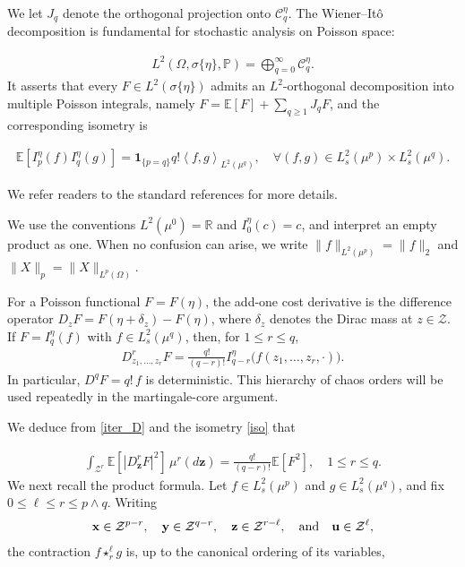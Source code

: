 \documentclass[letterpaper,11pt,reqno]{amsart}
\numberwithin{equation}{section}
\theoremstyle{plain}
\theoremstyle{definition}
\theoremstyle{remark}
\newcommand{\E}{\mathbb{E}}
\newcommand{\PP}{\mathbb{P}}
\newcommand{\R}{\mathbb{R}}
\newcommand{\ind}{\mathbf{1}}
\newcommand{\cC}{\mathcal{C}}
\newcommand{\cZ}{\mathcal{Z}}
\newcommand{\noi}{\noindent}
\newcommand{\dd}{d}
\newcommand{\s}{\sigma}
\newcommand{\inner}[2]{\left\langle #1,#2\right\rangle}
\newcommand{\AND}{\quad{\rm and}\quad}
\begin{document}
We let $J_q$ denote the orthogonal projection onto $\cC_q^\eta$.
The Wiener--It\^o decomposition is fundamental for stochastic
analysis on Poisson space:

\noi
\begin{align*}
 L^2(\Omega, \s\{\eta\}, \PP)
 =\bigoplus_{q=0}^{\infty}\cC_q^\eta.
\end{align*}
It asserts that every $F\in L^2(\sigma\{\eta\})$ admits an
$L^2$-orthogonal decomposition into multiple Poisson integrals, namely
$F=\E[F]+\sum_{q\geq1}J_qF$,
and the corresponding isometry is

\noi
\begin{align}
 \E[I_p^\eta(f)I_q^\eta(g)]
 =\ind_{\{p=q\}}q!
 \inner{f}{g}_{L^2(\mu^q)},
 \quad
 \forall (f,g)\in L_s^2(\mu^p)\times L_s^2(\mu^q).
 \label{iso}
\end{align}

We refer readers to
the standard references \cite{PT11,Las16,LP18}
for more details.

We use the conventions $L^2(\mu^0)=\R$ and
$I_0^\eta(c)=c$, and interpret an empty product as one.
When no confusion can arise, we write
$\|f\|_{L^2(\mu^p)}=\|f\|_2$ and
$\|X\|_p=\|X\|_{L^p(\Omega)}$.


For a Poisson functional $F=F(\eta)$, the add-one cost derivative
is the difference operator
$D_zF=F(\eta+\delta_z)-F(\eta)$,
where $\delta_z$ denotes the Dirac mass at $z\in\cZ$.
If $F=I_q^\eta(f)$ with $f\in L^2_s(\mu^q)$, then, for
$1\leq r\leq q$,
\noi
\begin{align}
 D^r_{z_1,\ldots,z_r}F
 = \frac{q!}{(q-r)!} I_{q-r}^\eta
 \bigl(f(z_1,\ldots,z_r,\cdot)\bigr).
 \label{iter_D}
\end{align}
In particular, $D^qF=q!\,f$ is deterministic.  This hierarchy of
chaos orders will be used repeatedly in the martingale-core argument.

We deduce from \eqref{iter_D} and the isometry \eqref{iso} that

\noi
\begin{align}
 \int_{\cZ^r}\E[|D^r_{\boldsymbol z}F|^2]
 \,\mu^r(\dd\boldsymbol z)
 =\frac{q!}{(q-r)!}\E[F^2],
 \quad 1\leq r\leq q.
 \label{D_L2}
\end{align}
We next recall the product formula.  Let
$f\in L_s^2(\mu^p)$ and $g\in L_s^2(\mu^q)$, and fix
$0\leq\ell\leq r\leq p\wedge q$.
Writing
\begin{align*}
 \mathbf x\in \cZ^{p-r},\quad
 \mathbf y\in \cZ^{q-r},\quad
 \mathbf z\in \cZ^{r-\ell},
 \AND
 \mathbf u\in \cZ^\ell,
\end{align*}
the contraction $f\star_r^\ell g$ is,
up to the canonical ordering
of its variables,
\end{document}
